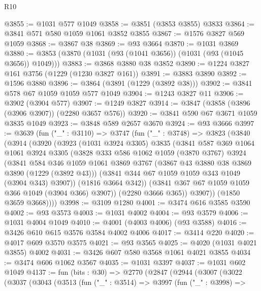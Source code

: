 \begin{lexlean}{R10}
\begin{coremodule}
@3855 := @1031 @577 @1049
@3858 := @3851 (@3853 @3855) @3833
@3864 := @3841 @571 @580 @1059 @1061 @3852 @3855
@3867 := @1576 @3827 @569 @1059
@3868 := @3867 @38
@3869 := @93 @3664
@3870 := @1031 @3869
@3880 := @3853 (@3870 (@1031 (@93 (@1041 @3656)) (@1031 (@93 (@1045 @3656)) @1049)))
@3883 := @3868 @3880 @38 @3852
@3890 := @1224 @3827 @161 @3756 (@1229 (@1230 @3827 @161))
@3891 := @3883 @3890
@3892 := @1596 @3880
@3896 := @3864 (@3891 (@1229 (@3892 @38)))
@3902 := @3841 @578 @67 @1059 @1059 @577 @1049
@3904 := @1243 @3827 @11
@3906 := @3902 (@3904 @577)
@3907 := @1249 @3827
@3914 := @3847 (@3858 (@3896 (@3906 @3907)) (@2280 @3657 @576))
@3920 := @3841 @590 @67 @3671 @1059 @3835 @1049
@3923 := @3848 @589 @2657 @3670
@3924 := @93 @3666
@3997 := @3639
    (fun ("_" : @3110) =>
    @3747
      (fun ("_" : @3748) =>
      @3823
        (@3840
          (@3914
            (@3920
              (@3923
                (@1031 @3924 @3305)
                @3835
                (@3841
                  @587
                  @369
                  @1064
                  @1061
                  @3924
                  @3305
                  (@3828
                    @333
                    @586
                    @1062
                    @1059
                    (@3870 @3767)
                    @3924
                    (@3841
                      @584
                      @346
                      @1059
                      @1061
                      @3869
                      @3767
                      (@3867 @43 @3880 @38 @3869 @3890 (@1229 (@3892 @43)))
                      (@3841 @344 @67 @1059 @1059 @343 @1049 (@3904 @343) @3907))
                    (@1816 @3664 @342))
                  (@3841 @367 @67 @1059 @1059 @366 @1049 (@3904 @366) @3907))
                (@2280 @3666 @365))
              @3907))
          (@1850 @3659 @3668))))
@3998 := @3109 @1280
@4001 := @3474 @616 @3585 @3590
@4002 := @93 @3573
@4003 := @1031 @4002
@4004 := @93 @3579
@4006 := @1031 @4004 @1049
@4010 := @4001 (@4003 @4006) (@93 @3588)
@4016 := @3426 @610 @615 @3576 @3584 @4002 @4006
@4017 := @3414 @220
@4020 := @4017 @609 @3570 @3575
@4021 := @93 @3565
@4025 := @4020 (@1031 @4021 @3855) @4002
@4031 := @3426 @607 @580 @3568 @1061 @4021 @3855
@4034 := @3474 @606 @1062 @3567
@4035 := @1031 @3397
@4037 := @1031 @602 @1049
@4137 := fun (bits : @30) =>
  @2770
    (@2847
      (@2944
        (@3007
          (@3022
            (@3037
              (@3043
                (@3513
                  (fun ("_" : @3514) =>
                  @3997
                    (fun ("_" : @3998) =>

\end{coremodule}
\end{lexlean}

